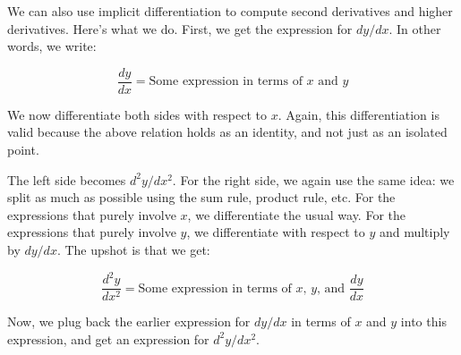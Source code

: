 \documentclass[10pt]{amsart}
\begin{document}
We can also use implicit differentiation to compute second derivatives
and higher derivatives. Here's what we do. First, we get the
expression for $dy/dx$. In other words, we write:

$$\frac{dy}{dx} = \text{Some expression in terms of $x$ and $y$}$$

We now differentiate both sides with respect to $x$. Again, this
differentiation is valid because the above relation holds as an
identity, and not just as an isolated point.

The left side becomes $d^2y/dx^2$. For the right side, we again use
the same idea: we split as much as possible using the sum rule,
product rule, etc. For the expressions that purely involve $x$, we
differentiate the usual way. For the expressions that purely involve
$y$, we differentiate with respect to $y$ and multiply by $dy/dx$.
The upshot is that we get:

$$\frac{d^2y}{dx^2} = \text{Some expression in terms of $x$, $y$, and $\frac{dy}{dx}$}$$

Now, we plug back the earlier expression for $dy/dx$ in terms of $x$
and $y$ into this expression, and get an expression for $d^2y/dx^2$.
\end{document}
